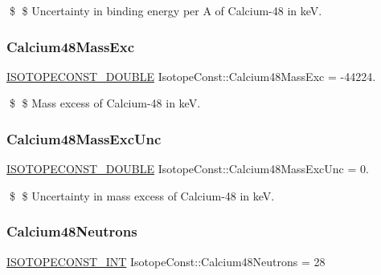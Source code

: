 \$ \$ Uncertainty in binding energy per A of Calcium-\/48 in keV. \mbox{\label{group___isotope_const-_calcium-_ca48_ga57ca4aa00550144d2b512bb373680fad}} 
\subsubsection{\texorpdfstring{Calcium48\+Mass\+Exc}{Calcium48MassExc}}
{\footnotesize\ttfamily \mbox{\hyperlink{group___isotope_const-_macros_ga8f45a7272ce02c0b4c65c44636ed719a}{I\+S\+O\+T\+O\+P\+E\+C\+O\+N\+S\+T\+\_\+\+D\+O\+U\+B\+LE}} Isotope\+Const\+::\+Calcium48\+Mass\+Exc = -\/44224.}

\$ \$ Mass excess of Calcium-\/48 in keV. \mbox{\label{group___isotope_const-_calcium-_ca48_gae13c0e60129c850d2c278d3794243a14}} 
\subsubsection{\texorpdfstring{Calcium48\+Mass\+Exc\+Unc}{Calcium48MassExcUnc}}
{\footnotesize\ttfamily \mbox{\hyperlink{group___isotope_const-_macros_ga8f45a7272ce02c0b4c65c44636ed719a}{I\+S\+O\+T\+O\+P\+E\+C\+O\+N\+S\+T\+\_\+\+D\+O\+U\+B\+LE}} Isotope\+Const\+::\+Calcium48\+Mass\+Exc\+Unc = 0.}

\$ \$ Uncertainty in mass excess of Calcium-\/48 in keV. \mbox{\label{group___isotope_const-_calcium-_ca48_ga9a14bafed783447f8a713d79d99e96b9}} 
\subsubsection{\texorpdfstring{Calcium48\+Neutrons}{Calcium48Neutrons}}
{\footnotesize\ttfamily \mbox{\hyperlink{group___isotope_const-_macros_ga5f18360b3e99483a35c32d789e62621c}{I\+S\+O\+T\+O\+P\+E\+C\+O\+N\+S\+T\+\_\+\+I\+NT}} Isotope\+Const\+::\+Calcium48\+Neutrons = 28}

